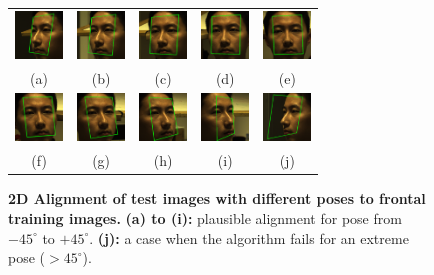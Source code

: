 \documentclass[10pt,journal,letterpaper,compsoc]{IEEEtran} %
\begin{document}
\begin{figure}
\centering
{\small
\begin{tabular}{ccccc}
\includegraphics[height=0.5in]{figures_cvpr/5} &
\includegraphics[height=0.5in]{figures_cvpr/7} &
\includegraphics[height=0.5in]{figures_cvpr/09} &
\includegraphics[height=0.5in]{figures_cvpr/11} &
\includegraphics[height=0.5in]{figures_cvpr/13} \vspace{0mm} \\
(a) & (b) & (c) & (d) & (e)\\
\includegraphics[height=0.5in]{figures_cvpr/15} &
\includegraphics[height=0.5in]{figures_cvpr/17} &
\includegraphics[height=0.5in]{figures_cvpr/19} &
\includegraphics[height=0.5in]{figures_cvpr/21} &
\includegraphics[height=0.5in]{figures_cvpr/3} \vspace{0mm} \\
(f) & (g) & (h) & (i) & (j) \vspace{0mm}
\end{tabular}
}
\caption{{\bf 2D Alignment of test images with different poses to frontal training images.} {\bf (a) to (i):}  plausible alignment for pose from $-45^{\circ}$
to $+45^{\circ}$. {\bf (j):} a case when the algorithm fails for an extreme pose ($>45^{\circ}$).
}\label{fig:pose-alignment} \vspace{-4mm}
\end{figure}
\end{document}
